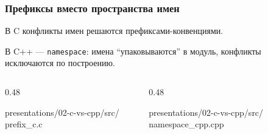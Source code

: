 \documentclass[compress, 8pt, aspectratio=169]{beamer}
\begin{document}
\begin{frame}[fragile]

    \frametitle{Префиксы вместо пространства имен}

    \begin{myitemize}

        \item В C конфликты имен решаются префиксами-конвенциями.

        \item В C++ --- \texttt{namespace}: имена
        \enquote{упаковываются} в модуль, конфликты исключаются
        по построению.

    \end{myitemize}

    \begin{columns}[T]

        \begin{column}{0.48\textwidth}

                {presentations/02-c-vs-cpp/src/}
                {prefix_c.c}

        \end{column}

        \begin{column}{0.48\textwidth}

                {presentations/02-c-vs-cpp/src/}
                {namespace_cpp.cpp}

        \end{column}

    \end{columns}

\end{frame}
\end{document}
